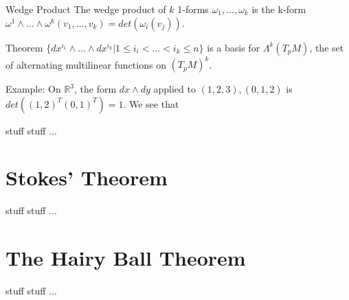 \documentclass[9pt]{beamer}
\begin{document}
\begin{frame}
    \begin{block}{Wedge Product}
        The wedge product of $k$ 1-forms $\omega_1, \dots, \omega_k$ is the k-form $\omega^1\wedge\dots\wedge\omega^k(v_1, \dots, v_k)=det(\omega_i(v_j))$.
    \end{block}

    \begin{block}{Theorem}
        $\{dx^{i_1}\wedge\dots\wedge dx^{i_k}|1\leq i_i<\dots<i_k\leq n\}$ is a basis for $\Lambda^k(T_pM)$, the set of alternating multilinear functions on $(T_pM)^k$.
    \end{block}

    Example: On $\mathbb{R}^3$, the form $dx\wedge dy$ applied to $(1,2,3),(0,1,2)$ is $det((1,2)^T(0,1)^T)=1$. We see that 
\end{frame}

\begin{frame}
    \begin{block}{stuff}
        stuff ...
    \end{block}
\end{frame}

\section{Stokes' Theorem}

\begin{frame}
    \begin{block}{stuff}
        stuff ...
    \end{block}
\end{frame}

\section{The Hairy Ball Theorem}

\begin{frame}
    \begin{block}{stuff}
        stuff ...
    \end{block}
\end{frame}
\end{document}
